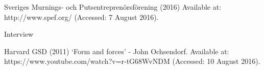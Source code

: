 \begin{thebibliography}{69}
Sveriges Murnings- och Putsentreprenörsförening (2016) Available at: http://www.spef.org/ (Accessed: 7 August 2016).

Interview

 Harvard GSD (2011) ‘Form and forces’ - John Ochsendorf. Available at: https://www.youtube.com/watch?v=r-tG68WvNDM (Accessed: 10 August 2016).

\end{thebibliography}





